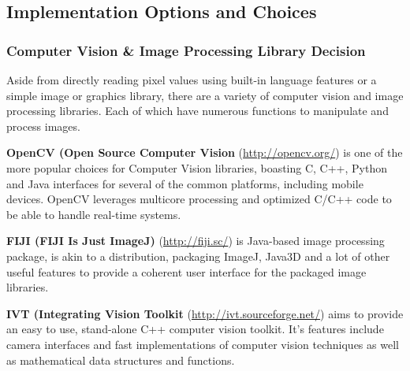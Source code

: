 \documentclass[11pt,fleqn,twoside]{article}
\begin{document}
\subsection{Implementation Options and Choices}

\subsubsection{Computer Vision \& Image Processing Library Decision}

Aside from directly reading pixel values using built-in language features or a simple image or 
graphics library, there are a variety of computer vision and image processing libraries. Each of
which have numerous functions to manipulate and process images.

\textbf{OpenCV (Open Source Computer Vision} (\url{http://opencv.org/}) is one of the more popular 
choices for Computer Vision libraries, boasting C, C++, Python and Java interfaces for several of 
the common platforms, including mobile devices. OpenCV leverages multicore processing and 
optimized C/C++ code to be able to handle real-time systems.

\textbf{FIJI (FIJI Is Just ImageJ)} (\url{http://fiji.sc/}) is Java-based image processing package,
is akin to a distribution, packaging ImageJ, Java3D and a lot of other useful features to provide
a coherent user interface for the packaged image libraries.

\textbf{IVT (Integrating Vision Toolkit} (\url{http://ivt.sourceforge.net/}) aims to provide an
easy to use, stand-alone C++ computer vision toolkit. It's features include camera interfaces and
fast implementations of computer vision techniques as well as mathematical data structures and 
functions.
\end{document}
